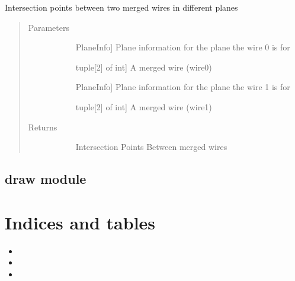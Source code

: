 \documentclass[letterpaper,10pt,english]{sphinxmanual}
\begin{document}

\begin{fulllineitems}
\label{\detokenize{geometryReco:geometryReco.wireIntersection}}
Intersection points between two merged wires in different planes
\begin{quote}\begin{description}
\item[{Parameters}] \leavevmode\begin{description}
\item[{}] \leavevmode{[}PlaneInfo{]}
Plane information for the plane the wire 0 is for

\item[{}] \leavevmode{[}tuple{[}2{]} of int{]}
A merged wire (wire0)

\item[{}] \leavevmode{[}PlaneInfo{]}
Plane information for the plane the wire 1 is for

\item[{}] \leavevmode{[}tuple{[}2{]} of int{]}
A merged wire (wire1)

\end{description}

\item[{Returns}] \leavevmode\begin{description}
\item[{}] \leavevmode
Intersection Points Between merged wires

\end{description}

\end{description}\end{quote}

\end{fulllineitems}



\section{draw module}
\label{\detokenize{draw:draw-module}}\label{\detokenize{draw::doc}}

\chapter{Indices and tables}
\label{\detokenize{index:indices-and-tables}}\begin{itemize}
\item {} 

\item {} 

\item {} 

\end{itemize}
\end{document}
